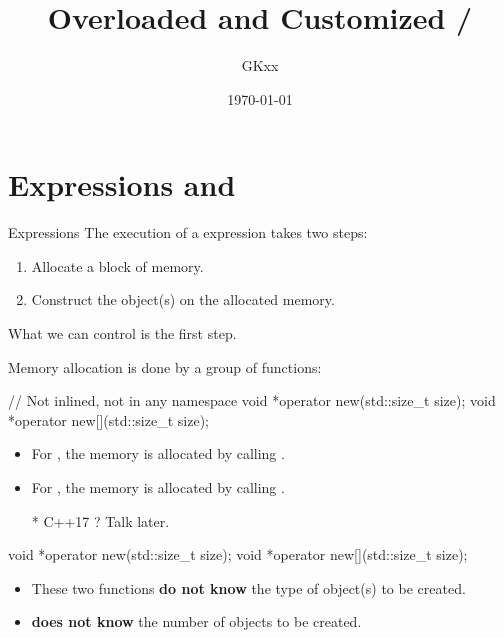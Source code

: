 \documentclass{beamer}
\title{Overloaded and Customized \ttt{new}/\ttt{delete}}
\author{GKxx}
\date{\today}
\begin{document}
\begin{frame}
	\maketitle
\end{frame}

\begin{frame}
  \tableofcontents
\end{frame}

\section{ Expressions and }

\begin{frame}{ Expressions}
  The execution of a  expression takes two steps:
  \begin{enumerate}
    \item Allocate a block of memory.
    \item Construct the object(s) on the allocated memory.
  \end{enumerate}
  What we can control is the first step.
\end{frame}

\begin{frame}[fragile]{}
  Memory allocation is done by a group of functions:
  \begin{cpp}
// Not inlined, not in any namespace
void *operator new(std::size_t size);
void *operator new[](std::size_t size);
  \end{cpp}
  \begin{itemize}
    \item For , the memory is allocated by calling .
    \item For , the memory is allocated by calling .
    \item[*]{\footnotesize C++17 ? Talk later.}
  \end{itemize}
\end{frame}

\begin{frame}[fragile]{}
  \begin{cpp}
void *operator new(std::size_t size);
void *operator new[](std::size_t size);
  \end{cpp}
  \begin{itemize}
    \item These two functions \textbf{do not know} the type of object(s) to be created.
    \item {} \textbf{does not know} the number of objects to be created.
  \end{itemize}
\end{frame}
\end{document}
